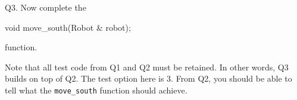 Q3.
Now complete the
{\small
\begin{console}
void move_south(Robot & robot);
\end{console}
}
function.

Note that all test code from Q1 and Q2 must be retained.
In other words, Q3 builds on top of Q2.
The test option here is 3.
From Q2, you should be able to tell what the
\verb!move_south! function should achieve.

